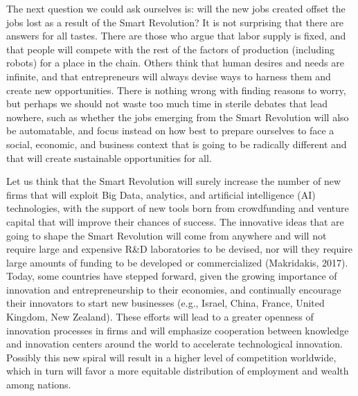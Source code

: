 \documentclass[
  letterpaper,
  DIV=11,
  numbers=noendperiod]{scrreprt}
\begin{document}
The next question we could ask ourselves is: will the new jobs created
offset the jobs lost as a result of the Smart Revolution? It is not
surprising that there are answers for all tastes. There are those who
argue that labor supply is fixed, and that people will compete with the
rest of the factors of production (including robots) for a place in the
chain. Others think that human desires and needs are infinite, and that
entrepreneurs will always devise ways to harness them and create new
opportunities. There is nothing wrong with finding reasons to worry, but
perhaps we should not waste too much time in sterile debates that lead
nowhere, such as whether the jobs emerging from the Smart Revolution
will also be automatable, and focus instead on how best to prepare
ourselves to face a social, economic, and business context that is going
to be radically different and that will create sustainable opportunities
for all.

Let us think that the Smart Revolution will surely increase the number
of new firms that will exploit Big Data, analytics, and artificial
intelligence (AI) technologies, with the support of new tools born from
crowdfunding and venture capital that will improve their chances of
success. The innovative ideas that are going to shape the Smart
Revolution will come from anywhere and will not require large and
expensive R\&D laboratories to be devised, nor will they require large
amounts of funding to be developed or commercialized (Makridakis, 2017).
Today, some countries have stepped forward, given the growing importance
of innovation and entrepreneurship to their economies, and continually
encourage their innovators to start new businesses (e.g., Israel, China,
France, United Kingdom, New Zealand). These efforts will lead to a
greater openness of innovation processes in firms and will emphasize
cooperation between knowledge and innovation centers around the world to
accelerate technological innovation. Possibly this new spiral will
result in a higher level of competition worldwide, which in turn will
favor a more equitable distribution of employment and wealth among
nations.
\end{document}
